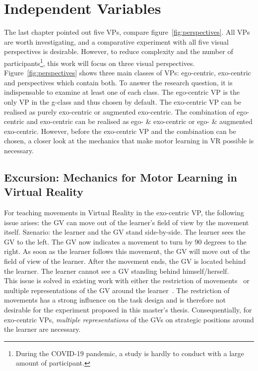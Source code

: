 \section{Independent Variables}
\label{sec:visualPerspecticves}
The last chapter pointed out five VPs, compare figure~\ref{fig:perspectives}. All VPs are worth investigating, and a comparative experiment with all five visual perspectives is desirable. However, to reduce complexity and the number of participants\footnote{During the COVID-19 pandemic, a study is hardly to conduct with a large amount of participant.}, this work will focus on three visual perspectives.\\
Figure~\ref{fig:perspectives} shows three main classes of VPs: ego-centric, exo-centric and perspectives which contain both. To answer the research question, it is indispensable to examine at least one of each class. The ego-centric VP is the only VP in the g-class and thus chosen by default. The exo-centric VP can be realised as purely exo-centric or augmented exo-centric. The combination of ego-centric and exo-centric can be realised as ego- \& exo-centric or ego- \& augmented exo-centric. However, before the exo-centric VP and the combination can be chosen, a closer look at the mechanics that make motor learning in VR possible is necessary.

\subsection{Excursion: Mechanics for Motor Learning in Virtual Reality}
\label{sec:mechanics}
For teaching movements in Virtual Reality in the exo-centric VP, the following issue arises: the GV can move out of the learner's field of view by the movement itself. Szenario: the learner and the GV stand side-by-side. The learner sees the GV to the left. The GV now indicates a movement to turn by 90 degrees to the right. As soon as the learner follows this movement, the GV will move out of the field of view of the learner. After the movement ends, the GV is located behind the learner. The learner cannot see a GV standing behind himself/herself.\\
This issue is solved in existing work with either the restriction of movements~\cite{freethrowsimulator,elearningma} or multiple representations of the GV around the learner~\cite{thaichichua,mythaichicoaches}. The restriction of movements has a strong influence on the task design and is therefore not desirable for the experiment proposed in this master's thesis. Consequentially, for exo-centric VPs, \textit{multiple representations} of the GVs on strategic positions around the learner are necessary.\\

